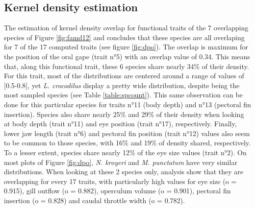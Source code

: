 \subsection{Kernel density estimation}
The estimation of kernel density overlap for functional traits of the 7 overlapping species of Figure \ref{fig:famd12} and concludes that these species are all overlaping for 7 of the 17 computed traits (see figure \ref{fig:dpo}). The overlap is maximum for the position of the oral gape (trait n°5) with an overlap value of 0.34. This means that, along this functional trait, these 6 species share nearly 34\% of their density. For this trait, most of the distributions are centered around a range of values of [0.5-0.8], yet \textit{L. crocodilus} display a pretty wide distribution, despite being the most sampled species (see Table \ref{table:spcount}). This same observation can be done for this particular species for traits n°11 (body depth) and n°13 (pectoral fin insertion). Species also share nearly 25\% and 29\% of their density when looking at body depth (trait n°11) and eye position (trait n°17), respectively. Finally, lower jaw length (trait n°6) and pectoral fin position (trait n°12) values also seem to be common to those species, with 16\% and 19\% of density shared, respectively. To a lesser extent, species share nearly 12\% of the eye size values (trait n°2).
On most plots of Figure \ref{fig:dpo}, \textit{N. kroyeri} and \textit{M. punctatum} have very similar distributions. When looking at these 2 species only, analysis show that they are overlapping for every 17 traits, with particularly high values for eye size (o = 0.915), gill outflow (o = 0.882), operculum volume (o = 0.901), pectoral fin insertion (o = 0.828) and caudal throttle width (o = 0.782). 


